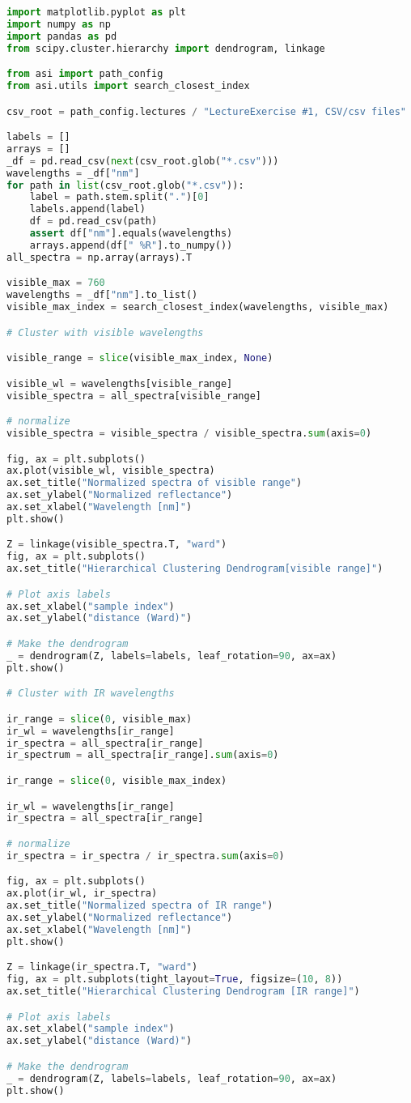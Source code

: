 \begin{lstlisting}[language=python, caption=Code for clustering all materials, label={code:cluster-materials}]
import matplotlib.pyplot as plt
import numpy as np
import pandas as pd
from scipy.cluster.hierarchy import dendrogram, linkage

from asi import path_config
from asi.utils import search_closest_index

csv_root = path_config.lectures / "LectureExercise #1, CSV/csv files"

labels = []
arrays = []
_df = pd.read_csv(next(csv_root.glob("*.csv")))
wavelengths = _df["nm"]
for path in list(csv_root.glob("*.csv")):
    label = path.stem.split(".")[0]
    labels.append(label)
    df = pd.read_csv(path)
    assert df["nm"].equals(wavelengths)
    arrays.append(df[" %R"].to_numpy())
all_spectra = np.array(arrays).T

visible_max = 760
wavelengths = _df["nm"].to_list()
visible_max_index = search_closest_index(wavelengths, visible_max)

# Cluster with visible wavelengths

visible_range = slice(visible_max_index, None)

visible_wl = wavelengths[visible_range]
visible_spectra = all_spectra[visible_range]

# normalize
visible_spectra = visible_spectra / visible_spectra.sum(axis=0)

fig, ax = plt.subplots()
ax.plot(visible_wl, visible_spectra)
ax.set_title("Normalized spectra of visible range")
ax.set_ylabel("Normalized reflectance")
ax.set_xlabel("Wavelength [nm]")
plt.show()

Z = linkage(visible_spectra.T, "ward")
fig, ax = plt.subplots()
ax.set_title("Hierarchical Clustering Dendrogram[visible range]")

# Plot axis labels
ax.set_xlabel("sample index")
ax.set_ylabel("distance (Ward)")

# Make the dendrogram
_ = dendrogram(Z, labels=labels, leaf_rotation=90, ax=ax)
plt.show()

# Cluster with IR wavelengths

ir_range = slice(0, visible_max)
ir_wl = wavelengths[ir_range]
ir_spectra = all_spectra[ir_range]
ir_spectrum = all_spectra[ir_range].sum(axis=0)

ir_range = slice(0, visible_max_index)

ir_wl = wavelengths[ir_range]
ir_spectra = all_spectra[ir_range]

# normalize
ir_spectra = ir_spectra / ir_spectra.sum(axis=0)

fig, ax = plt.subplots()
ax.plot(ir_wl, ir_spectra)
ax.set_title("Normalized spectra of IR range")
ax.set_ylabel("Normalized reflectance")
ax.set_xlabel("Wavelength [nm]")
plt.show()

Z = linkage(ir_spectra.T, "ward")
fig, ax = plt.subplots(tight_layout=True, figsize=(10, 8))
ax.set_title("Hierarchical Clustering Dendrogram [IR range]")

# Plot axis labels
ax.set_xlabel("sample index")
ax.set_ylabel("distance (Ward)")

# Make the dendrogram
_ = dendrogram(Z, labels=labels, leaf_rotation=90, ax=ax)
plt.show()
\end{lstlisting}
